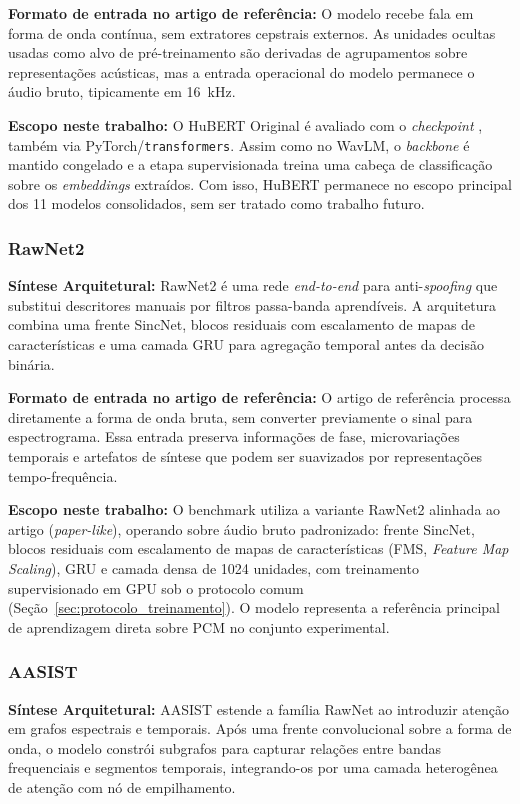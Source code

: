 \documentclass[12pt,a4paper]{article}
\begin{document}
\par\textbf{Formato de entrada no artigo de referência:} O modelo recebe fala
em forma de onda contínua, sem extratores cepstrais externos. As unidades
ocultas usadas como alvo de pré-treinamento são derivadas de agrupamentos sobre
representações acústicas, mas a entrada operacional do modelo permanece o
áudio bruto, tipicamente em \SI{16}{\kilo\hertz}.

\par\textbf{Escopo neste trabalho:} O HuBERT Original é avaliado com o
\textit{checkpoint} , também via
PyTorch/\texttt{transformers}. Assim como no WavLM, o \textit{backbone} é
mantido congelado e a etapa supervisionada treina uma cabeça de classificação
sobre os \textit{embeddings} extraídos. Com isso, HuBERT permanece no escopo
principal dos \num{11} modelos consolidados, sem ser tratado como trabalho
futuro.

\subsubsection*{RawNet2 \cite{tak2021rawnet2}}
\textbf{Síntese Arquitetural:} RawNet2 é uma rede \textit{end-to-end} para
anti-\textit{spoofing} que substitui descritores manuais por filtros
passa-banda aprendíveis. A arquitetura combina uma frente SincNet, blocos
residuais com escalamento de mapas de características e uma camada GRU para
agregação temporal antes da decisão binária.

\par\textbf{Formato de entrada no artigo de referência:} O artigo de referência
processa diretamente a forma de onda bruta, sem converter previamente o sinal
para espectrograma. Essa entrada preserva informações de fase, microvariações
temporais e artefatos de síntese que podem ser suavizados por representações
tempo-frequência.

\par\textbf{Escopo neste trabalho:} O benchmark utiliza a variante RawNet2
alinhada ao artigo (\textit{paper-like}), operando sobre áudio bruto
padronizado: frente SincNet, blocos residuais com escalamento de mapas de
características (FMS, \textit{Feature Map Scaling}), GRU e camada densa de
\num{1024} unidades, com treinamento supervisionado em GPU sob o protocolo
comum (Seção~\ref{sec:protocolo_treinamento}). O modelo representa a
referência principal de aprendizagem direta sobre PCM no conjunto
experimental.

\subsubsection*{AASIST \cite{jung2022aasist}}
\textbf{Síntese Arquitetural:} AASIST estende a família RawNet ao introduzir
atenção em grafos espectrais e temporais. Após uma frente convolucional sobre a
forma de onda, o modelo constrói subgrafos para capturar relações entre bandas
frequenciais e segmentos temporais, integrando-os por uma camada heterogênea de
atenção com nó de empilhamento.
\end{document}

